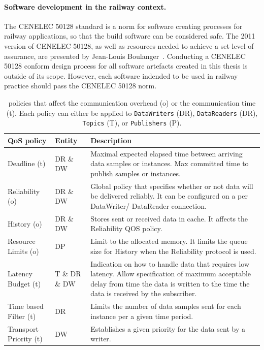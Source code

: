 \paragraph{Software development in the railway context.}
The CENELEC 50128 standard is a norm for software creating processes for railway applications, so that the build software can be considered safe.
The 2011 version of CENELEC 50128, as well as resources needed to achieve a set level of assurance, are presented by Jean-Louis Boulanger~\cite{BoulangerStandards}.
Conducting a CENELEC 50128 conform design process for all software artefacts created in this thesis is outside of its scope.
However, each software indended to be used in railway practice should pass the CENELEC 50128 norm.
\\

\begin{table}[h!]
	\begin{center}
		\caption{ policies that affect the communication overhead (o) or the communication time (t). Each  policy can either be applied to \texttt{DataWriters} (DR), \texttt{DataReaders} (DR), \texttt{Topics} (T), or \texttt{Publishers} (P).}
		\label{tab:qos_garciavalls}
		\begin{tabularx}{\textwidth}{|l|l|X|}
			\hline
			\textbf{QoS policy} & \textbf{Entity} & \textbf{Description}\\
			\hline \hline
			Deadline (t) & DR \& DW & Maximal expected elapsed time between arriving data samples or instances. Max committed time to publish samples or instances.\\
			\hline
			Reliability (o) & DR \& DW & Global policy that specifies whether or not data will be delivered reliably. It can be configured on a per DataWriter/-DataReader connection. \\
			\hline
			History (o) & DR \& DW & Stores sent or received data in cache. It affects the Reliability \gls*{QOS} policy. \\
			\hline
			Resource Limits (o) & DP & Limit to the allocated memory. It limits the queue size for History when the Reliability protocol is used. \\
			\hline
			Latency Budget (t) & T \& DR \& DW & Indication on how to handle data that requires low latency. Allow specification of maximum acceptable delay from time the data is written to the time the data is received by the subscriber. \\
			\hline
			Time based Filter (t) & DR & Limits the number of data samples sent for each instance per a given time period. \\
			\hline
			Transport Priority (t) & DW & Establishes a given priority for the data sent by a writer.\\
			\hline
		\end{tabularx}
	\end{center}
\end{table}

